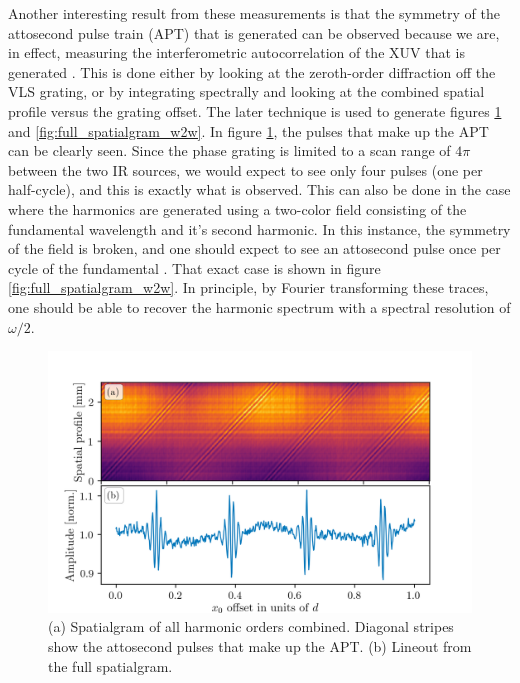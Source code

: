 Another interesting result from these measurements is that the symmetry of the attosecond pulse train (APT) that is generated can be observed because we are, in effect, measuring the interferometric autocorrelation of the XUV that is generated \cite{nabekawaInterferometryAttosecondPulse2013, nabekawaInterferometricAutocorrelationAttosecond2008, mengInterferometricTimeDelay2016, kovacevExtremeUltravioletFourierTransform2005}.  This is done either by looking at the zeroth-order diffraction off the VLS grating, or by integrating spectrally and looking at the combined spatial profile versus the grating offset.  The later technique is used to generate figures \ref{fig:full_spatialgram} and \ref{fig:full_spatialgram_w2w}.  In figure \ref{fig:full_spatialgram}, the pulses that make up the APT can be clearly seen.  Since the phase grating is limited to a scan range of $4\pi$ between the two IR sources, we would expect to see only four pulses (one per half-cycle), and this is exactly what is observed.  This can also be done in the case where the harmonics are generated using a two-color field consisting of the fundamental wavelength and it's second harmonic.  In this instance, the symmetry of the field is broken, and one should expect to see an attosecond pulse once per cycle of the fundamental \cite{kimHighlyEfficientHighHarmonic2005, dudovichSubcycleSpatialMapping2009, dudovichMeasuringControllingBirth2006}.  That exact case is shown in figure \ref{fig:full_spatialgram_w2w}.  In principle, by Fourier transforming these traces, one should be able to recover the harmonic spectrum with a spectral resolution of $\omega/2$.
\begin{figure}
	\centering
	\includegraphics[width=1.0\textwidth]{figures/Two_source/full_spatialgram.png}
	\caption[Spatialgram of all harmonic orders combined, demonstrating autocorrelation of an APT using a SWPG]{(a) Spatialgram of all harmonic orders combined. Diagonal stripes show the attosecond pulses that make up the APT. (b) Lineout from the full spatialgram.  }
	\label{fig:full_spatialgram}
\end{figure}
